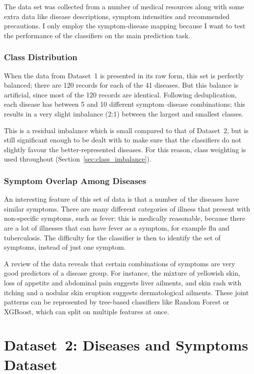 The data set was collected from a number of medical resources along with some extra data like disease descriptions, symptom intensities and recommended precautions. I only employ the symptom-disease mapping because I want to test the performance of the classifiers on the main prediction task.

\subsubsection{Class Distribution}

When the data from Dataset~1 is presented in its raw form, this set is perfectly balanced; there are 120 records for each of the 41 diseases. But this balance is artificial, since most of the 120 records are identical. Following deduplication, each disease has between 5 and 10 different symptom--disease combinations; this results in a very slight imbalance (2:1) between the largest and smallest classes.

This is a residual imbalance which is small compared to that of Dataset~2, but is still significant enough to be dealt with to make sure that the classifiers do not slightly favour the better-represented diseases. For this reason, class weighting is used throughout (Section~\ref{sec:class_imbalance}).

\subsubsection{Symptom Overlap Among Diseases}

An interesting feature of this set of data is that a number of the diseases have similar symptoms. There are many different categories of illness that present with non-specific symptoms, such as fever: this is medically reasonable, because there are a lot of illnesses that can have fever as a symptom, for example flu and tuberculosis. The difficulty for the classifier is then to identify the set of symptoms, instead of just one symptom.

A review of the data reveals that certain combinations of symptoms are very good predictors of a disease group. For instance, the mixture of yellowish skin, loss of appetite and abdominal pain suggests liver ailments, and skin rash with itching and a nodular skin eruption suggests dermatological ailments. These joint patterns can be represented by tree-based classifiers like Random Forest or XGBoost, which can split on multiple features at once.

\section{Dataset~2: Diseases and Symptoms Dataset}
\label{sec:dataset2}

